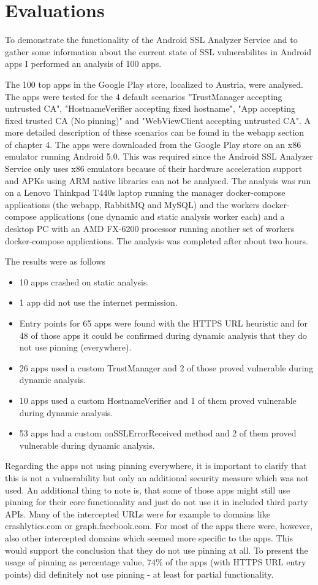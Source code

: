 \documentclass[draft,final]{vutinfth} %
\begin{document}
\chapter{Evaluations}

To demonstrate the functionality of the Android SSL Analyzer Service and to gather some information about the current state of SSL vulnerabilites in Android apps I performed an analysis of 100 apps.

The 100 top apps in the Google Play store, localized to Austria, were analysed. The apps were tested for the 4 default scenarios "TrustManager accepting untrusted CA", "HostnameVerifier accepting fixed hostname", "App accepting fixed trusted CA (No pinning)" and "WebViewClient accepting untrusted CA". A more detailed description of these scenarios can be found in the webapp section of chapter 4. The apps were downloaded from the Google Play store on an x86 emulator running Android 5.0. This was required since the Android SSL Analyzer Service only uses x86 emulators because of their hardware acceleration support and APKs using ARM native libraries can not be analysed. The analysis was run on a Lenovo Thinkpad T440s laptop running the manager docker-compose applications (the webapp, RabbitMQ and MySQL) and the workers docker-compose applications (one dynamic and static analysis worker each) and a desktop PC with an AMD FX-6200 processor running another set of workers docker-compose applications. The analysis was completed after about two hours. 

The results were as follows
\begin{itemize}
\item 10 apps crashed on static analysis.
\item 1 app did not use the internet permission.
\item Entry points for 65 apps were found with the HTTPS URL heuristic and for 48 of those apps it could be confirmed during dynamic analysis that they do not use pinning (everywhere).
\item 26 apps used a custom TrustManager and 2 of those proved vulnerable during dynamic analysis.
\item 10 apps used a custom HostnameVerifier and 1 of them proved vulnerable during dynamic analysis.
\item 53 apps had a custom onSSLErrorReceived method and 2 of them proved vulnerable during dynamic analysis.
\end{itemize}

Regarding the apps not using pinning everywhere, it is important to clarify that this is not a vulnerability but only an additional security measure which was not used. An additional thing to note is, that some of those apps might still use pinning for their core functionality and just do not use it in included third party APIs. Many of the intercepted URLs were for example to domains like crashlytics.com or graph.facebook.com. For most of the apps there were, however, also other intercepted domains which seemed more specific to the apps. This would support the conclusion that they do not use pinning at all. To present the usage of pinning as percentage value, 74\% of the apps (with HTTPS URL entry points) did definitely not use pinning - at least for partial functionality.
\end{document}
